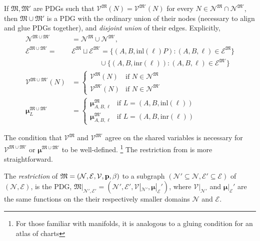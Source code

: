 \documentclass{article}
\theoremstyle{plain}
\theoremstyle{definition}
\theoremstyle{remark}
\newcommand{\notation}[2][]{#1}
\renewcommand{\notation}[2][]{{\color{notationcolor} #2}}
\newcommand{\vfullfootnote}[1]{}
\renewcommand{\vfullfootnote}[1]{\footnote{#1}}
\newcommand{\bmu}{\boldsymbol{\mu}}
\newcommand{\V}{\mathcal V}
\newcommand{\N}{\mathcal N}
\newcommand{\Ed}{\mathcal E}
\newcommand{\dg}[1]{\mathfrak{#1}}
\newcommand{\MN}{PDG}
\numberwithin{equation}{section}
\begin{document}
\begin{vfull}
	\begin{defn}[union] \label{def:model-union}
		If $\dg M, \dg M'$ are \MN s such that $\V^\dg M(N) = \V^{\dg M'}(N)$ for every $N \in  \N^{\dg M} \cap \N^{\dg M'}$, then $\dg M \cup \dg M'$ is a PDG with the ordinary union of their nodes (necessary to align and glue PDGs together), and \emph{disjoint union} of their edges. \notation{Explicitly,
		\begin{align*}
			\N^{\dg M \cup \dg M'} &= \N^\dg M \cup \N^{\dg M'},  \\
			\Ed^{\dg M \cup \dg M'} \!=& \Ed^\dg M \sqcup \Ed^{\dg M'}\!
				=  \{ (A, B, \text{inl}(\ell)P) : (A,B,\ell)\in \Ed^\dg M \}  \\
					&\qquad\qquad \cup \{ (A, B, \text{inr}(\ell)) : (A,B,\ell)\in \Ed^{\dg M'} \} \\ 
			\V^{\dg M \cup \dg M'} (N) &= \begin{cases}
					\V^{\dg M}(N) & \text{if }N \in \N^\dg M \\
					\V^{\dg M'}(N) &\text{if }N \in \N^{\dg M'} 
				\end{cases}\\
			\bmu^{\dg M \cup \dg M'}_L &= \begin{cases}
				\bmu^{\dg M}_{A, B, \ell} &\text{if } L = (A, B, \text{inl} (\ell)) \\
				\bmu^{\dg M'}_{A, B, \ell} &\text{if } L = (A, B, \text{inr} (\ell)) 
			\end{cases}
		\end{align*}}
	\end{defn}
	The condition that $\V^\dg M$ and $\V^{\dg M'}$ agree on the shared variables is necessary for $\V^{\dg M\cup \dg M'}$ or $\bmu^{\dg M \cup \dg M'}$ to be well-defined.%
		\vfullfootnote{For those familiar with manifolds, it is analogous to a gluing condition for an atlas of charts}
	The restriction from  is more straightforward.%
	
	\begin{defn}[restriction]\label{def:restriction}
		The \emph{restriction} of $\dg M = \mnvars[]$ to a subgraph $(\N' \subseteq \N, \Ed' \subseteq \Ed)$ of $(\N, \Ed)$, is the PDG, $\dg M|_{\N', \Ed'} = (\N', \Ed', \V |_{\N'}, \bmu|_\Ed')$, where 
		$\V|_{\N'}$ and $\bmu|_\Ed'$ are the same functions on the their respectively smaller domains $\N$ and $\Ed$. 
	\end{defn}
	



\end{vfull}
\end{document}
